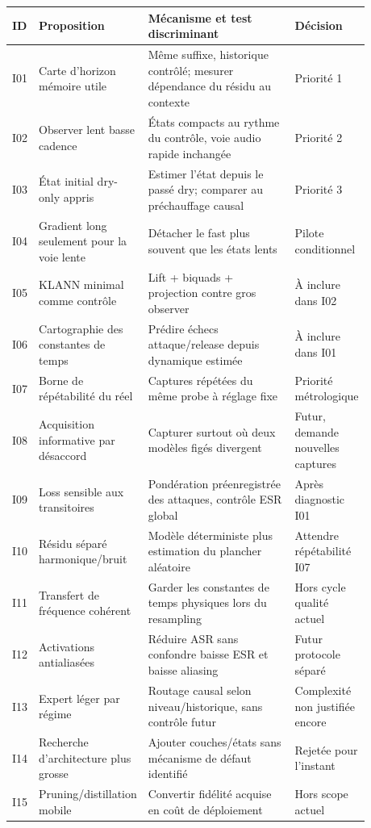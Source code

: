 \documentclass[10pt,a4paper]{article}
\begin{document}
\begin{longtable}{p{0.06\linewidth}p{0.23\linewidth}p{0.44\linewidth}p{0.15\linewidth}}
ID & Proposition & M\'{e}canisme et test discriminant & D\'{e}cision \\ \hline
I01 & Carte d'horizon m\'{e}moire utile & M\^{e}me suffixe, historique contr\^{o}l\'{e}; mesurer d\'{e}pendance du r\'{e}sidu au contexte & Priorit\'{e} 1 \\ \hline
I02 & Observer lent basse cadence & \'{E}tats compacts au rythme du contr\^{o}le, voie audio rapide inchang\'{e}e & Priorit\'{e} 2 \\ \hline
I03 & \'{E}tat initial dry-only appris & Estimer l'\'{e}tat depuis le pass\'{e} dry; comparer au pr\'{e}chauffage causal & Priorit\'{e} 3 \\ \hline
I04 & Gradient long seulement pour la voie lente & D\'{e}tacher le fast plus souvent que les \'{e}tats lents & Pilote conditionnel \\ \hline
I05 & KLANN minimal comme contr\^{o}le & Lift + biquads + projection contre gros observer & \`{A} inclure dans I02 \\ \hline
I06 & Cartographie des constantes de temps & Pr\'{e}dire \'{e}checs attaque/release depuis dynamique estim\'{e}e & \`{A} inclure dans I01 \\ \hline
I07 & Borne de r\'{e}p\'{e}tabilit\'{e} du r\'{e}el & Captures r\'{e}p\'{e}t\'{e}es du m\^{e}me probe \`{a} r\'{e}glage fixe & Priorit\'{e} m\'{e}trologique \\ \hline
I08 & Acquisition informative par d\'{e}saccord & Capturer surtout o\`{u} deux mod\`{e}les fig\'{e}s divergent & Futur, demande nouvelles captures \\ \hline
I09 & Loss sensible aux transitoires & Pond\'{e}ration pr\'{e}enregistr\'{e}e des attaques, contr\^{o}le ESR global & Apr\`{e}s diagnostic I01 \\ \hline
I10 & R\'{e}sidu s\'{e}par\'{e} harmonique/bruit & Mod\`{e}le d\'{e}terministe plus estimation du plancher al\'{e}atoire & Attendre r\'{e}p\'{e}tabilit\'{e} I07 \\ \hline
I11 & Transfert de fr\'{e}quence coh\'{e}rent & Garder les constantes de temps physiques lors du resampling & Hors cycle qualit\'{e} actuel \\ \hline
I12 & Activations antialias\'{e}es & R\'{e}duire ASR sans confondre baisse ESR et baisse aliasing & Futur protocole s\'{e}par\'{e} \\ \hline
I13 & Expert l\'{e}ger par r\'{e}gime & Routage causal selon niveau/historique, sans contr\^{o}le futur & Complexit\'{e} non justifi\'{e}e encore \\ \hline
I14 & Recherche d'architecture plus grosse & Ajouter couches/\'{e}tats sans m\'{e}canisme de d\'{e}faut identifi\'{e} & Rejet\'{e}e pour l'instant \\ \hline
I15 & Pruning/distillation mobile & Convertir fid\'{e}lit\'{e} acquise en co\^{u}t de d\'{e}ploiement & Hors scope actuel \\ \hline
\end{longtable}
\end{document}
